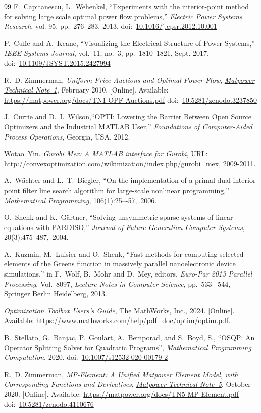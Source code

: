 \documentclass[12pt]{article}
\newcommand{\matpower}[0]{{\sc Matpower}}
\newcommand{\mpe}{{MP-Element}}
\newcommand{\TNoneurl}[0]{https://matpower.org/docs/TN1-OPF-Auctions.pdf}
\newcommand{\TNone}[0]{\href{\TNoneurl}{\it \matpower{} Technical Note~1}}
\newcommand{\TNfiveurl}[0]{https://matpower.org/docs/TN5-MP-Element.pdf}
\newcommand{\TNfive}[0]{\href{\TNfiveurl}{\it \matpower{} Technical Note~5}}
\newcommand{\doi}[1]{doi:~\href{https://doi.org/#1}{#1}}
\numberwithin{equation}{section}
\numberwithin{table}{section}
\numberwithin{figure}{section}
\begin{document}
\begin{thebibliography}{99}
F.~Capitanescu, L.~Wehenkel, ``Experiments with the interior-point method for solving large scale optimal power flow problems,'' \emph{Electric Power Systems Research}, vol. 95, pp.~276--283, 2013.
\doi{10.1016/j.epsr.2012.10.001}

P.~Cuffe and A.~Keane, ``Visualizing the Electrical Structure of Power Systems,'' \emph{IEEE Systems Journal}, vol.~11, no.~3, pp.~1810--1821, Sept. 2017.
\doi{10.1109/JSYST.2015.2427994}

R.~D. Zimmerman, \emph{Uniform Price Auctions and Optimal Power Flow}, \TNone, February 2010. [Online]. Available: \url{\TNoneurl}
\doi{10.5281/zenodo.3237850}

J.~Currie and D.~I.~Wilson,``OPTI: Lowering the Barrier Between Open Source Optimizers and the Industrial MATLAB User,'' \emph{Foundations of Computer-Aided Process Operations}, Georgia, USA, 2012.

Wotao~Yin. \emph{Gurobi Mex: A MATLAB interface for Gurobi}, URL: \url{http://convexoptimization.com/wikimization/index.php/gurobi_mex}, 2009-2011.

A.~W\"achter and L.~T.~Biegler, ``On the implementation of a primal-dual interior point filter line search algorithm for large-scale nonlinear programming,'' \emph{Mathematical Programming}, 106(1):25–-57,~2006.

O.~Shenk and K.~G\"artner, ``Solving unsymmetric sparse systems of linear equations with PARDISO,'' \emph{Journal of Future Generation Computer Systems}, 20(3):475--487,~2004.

A.~Kuzmin, M.~Luisier and O.~Shenk, ``Fast methods for computing selected elements of the Greens function in massively parallel nanoelectronic device simulations,'' in F.~Wolf, B.~Mohr and D.~Mey, editors, \emph{Euro-Par 2013 Parallel Processing}, Vol.~8097, \emph{Lecture Notes in Computer Science}, pp.~533–-544, Springer Berlin Heidelberg, 2013.

\emph{Optimization Toolbox Users's Guide}, The MathWorks, Inc., 2024.
  [Online]. Available: \url{https://www.mathworks.com/help/pdf_doc/optim/optim.pdf}.

B.~Stellato, G.~Banjac, P.~Goulart, A.~Bemporad, and S.~Boyd, S., ``{OSQP}: An Operator Splitting Solver for Quadratic Programs'', \emph{Mathematical Programming Computation}, 2020.
doi:~\href{https://doi.org/10.1007/s12532-020-00179-2}{10.1007/s12532-020-00179-2}

R.~D. Zimmerman, \emph{\mpe{}: A Unified \matpower{} Element Model, with Corresponding Functions and Derivatives}, \TNfive, October 2020. [Online]. Available: \url{\TNfiveurl}
\doi{10.5281/zenodo.4110676}


\end{thebibliography}
\end{document}
